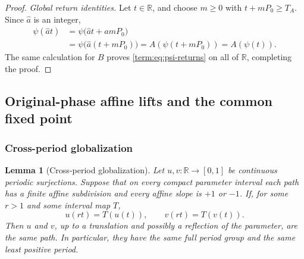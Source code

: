 \documentclass[11pt]{article}
\newtheorem{lemma}[theorem]{Lemma}
\theoremstyle{definition}
\theoremstyle{remark}
\newcommand{\I}{[0,1]}
\begin{document}
\begin{proof}
\smallskip
\noindent\emph{Global return identities.}
Let \(t\in\mathbb R\), and choose \(m\geq0\) with \(t+mP_0\geq T_A\).
Since \(\widehat a\) is an integer,
\[
\begin{split}
 \psi(\widehat a t)
 &=\psi\bigl(\widehat a t+\widehat a mP_0\bigr)\\
 &=\psi\bigl(\widehat a(t+mP_0)\bigr)
 =A(\psi(t+mP_0))
 =A(\psi(t)).
\end{split}
\]
The same calculation for \(B\) proves \eqref{term:eq:psi-returns} on all of
\(\mathbb R\), completing the proof.
\end{proof}

\subsection{Original-phase affine lifts and the common fixed point}

\subsubsection{Cross-period globalization}

\begin{lemma}[Cross-period globalization]\label{term:lem:cross-period}
Let \(u,v\colon\mathbb R\to\I\) be continuous periodic surjections.  Suppose
that on every compact parameter interval each path has a finite affine
subdivision and every affine slope is \(+1\) or \(-1\).  If, for some
\(r>1\) and some interval map \(T\),
\[
 u(rt)=T(u(t)),\qquad v(rt)=T(v(t)).
\]
Then \(u\) and \(v\), up to a translation and possibly a reflection of the
parameter, are the same path.  In particular, they have the same full period
group and the same least positive period.
\end{lemma}
\end{document}
